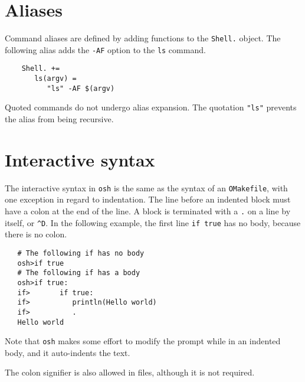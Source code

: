 \section{Aliases}

Command aliases are defined by adding functions to the \verb+Shell.+ object.  The following alias
adds the \verb+-AF+ option to the \verb+ls+ command.

\begin{verbatim}
    Shell. +=
       ls(argv) =
          "ls" -AF $(argv)
\end{verbatim}

Quoted commands do not undergo alias expansion.  The quotation \verb+"ls"+ prevents the alias from
being recursive.

\section{Interactive syntax}

The interactive syntax in \verb+osh+ is the same as the syntax of an \verb+OMakefile+, with one
exception in regard to indentation.  The line before an indented block must have a colon at the end
of the line.  A block is terminated with a \verb+.+ on a line by itself, or \verb+^D+.  In the
following example, the first line \verb+if true+ has no body, because there is no colon.

\begin{verbatim}
   # The following if has no body
   osh>if true
   # The following if has a body
   osh>if true:
   if>       if true:
   if>          println(Hello world)
   if>          .
   Hello world
\end{verbatim}

Note that \verb+osh+ makes some effort to modify the prompt while in an indented body, and it
auto-indents the text.

The colon signifier is also allowed in files, although it is not required.

